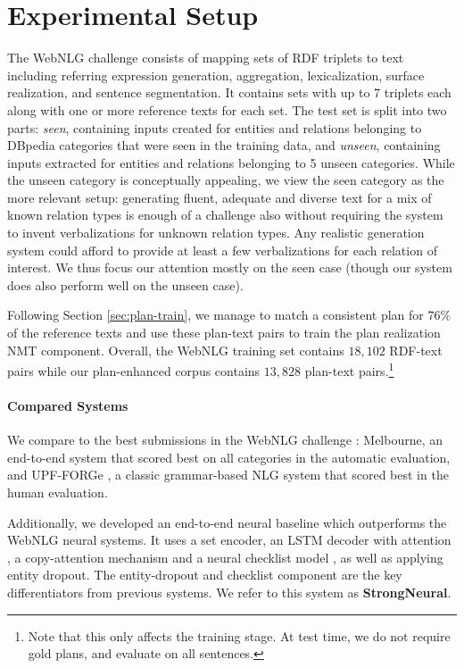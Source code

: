 \documentclass[11pt,a4paper]{article}
\newcommand\ourbaseline[0]{StrongNeural}
\begin{document}
\section{Experimental Setup}
The WebNLG challenge \cite{colin2016webnlg} consists of mapping sets of RDF triplets to text including referring expression generation, aggregation, lexicalization, surface realization, and sentence segmentation. It contains sets with up to 7 triplets each along with one or more reference texts for each set. The test set is split into two parts: \emph{seen}, containing inputs created for entities and relations belonging to DBpedia categories that were seen in the training data, and \emph{unseen}, containing inputs extracted for entities and relations belonging to 5 unseen categories. While the unseen category is conceptually appealing, we view the seen category as the more relevant setup: generating fluent, adequate and diverse text for a mix of known relation types is enough of a challenge also without requiring the system to invent verbalizations for unknown relation types. Any realistic generation system could afford to provide at least a few verbalizations for each relation of interest. We thus focus our attention mostly on the seen case (though our system does also perform well on the unseen case).

Following Section \ref{sec:plan-train}, we manage to match a consistent plan for $76\%$ of the reference texts and use these plan-text pairs to train the plan realization NMT component. Overall, the WebNLG training set contains $18,102$ RDF-text pairs while our plan-enhanced corpus contains $13,828$ plan-text pairs.\footnote{Note that this only affects the training stage. At test time, we do not require gold plans, and evaluate on all sentences.}

\paragraph{Compared Systems}
We compare to the best submissions in the WebNLG challenge \cite{gardent2017webnlg}: Melbourne, an end-to-end system that scored best on all categories in the automatic evaluation, and UPF-FORGe \cite{mille2017forge}, a classic grammar-based NLG system that scored best in the human evaluation.

Additionally, we developed an end-to-end neural baseline which outperforms the WebNLG neural systems. It uses a set encoder, an LSTM \cite{hochreiter1997long} decoder with attention \cite{attention}, a copy-attention mechanism \cite{gulcehre2016pointing} and a neural checklist model \cite{kiddon2016globally}, as well as applying entity dropout. The entity-dropout and checklist component are the key differentiators from previous systems. 
We refer to this system as \textbf{\ourbaseline}.
\end{document}
